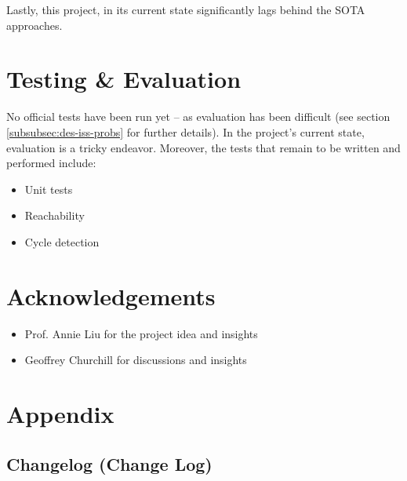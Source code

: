 \documentclass[12pt]{article}
\begin{document}
    Lastly, this project, in its current state significantly lags behind the SOTA approaches.
    
    \section{Testing \& Evaluation}
    \label{sec:test_eval}

    No official tests have been run yet -- as evaluation has been difficult (see section \ref{subsubsec:des-iss-probs} for further details). In the project's current state, evaluation is a tricky endeavor. Moreover, the tests that remain to be written and performed include:

    \begin{itemize}
        \item Unit tests
        \item Reachability
        \item Cycle detection
    \end{itemize}
    
    \section{Acknowledgements}
    \label{sec:ack}

    \begin{itemize}
        \item Prof. Annie Liu for the project idea and insights
        \item Geoffrey Churchill for discussions and insights
    \end{itemize}


    \newpage
    
    
    
    

    \newpage
    
    \section{Appendix}
    \label{sec:appendix}

    \subsection{Changelog (Change Log)}
    \label{subsec:change}
\end{document}
